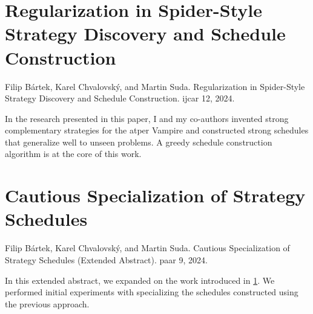 \section{Regularization in Spider-Style Strategy Discovery and Schedule Construction}
\label{sec:results:regularization}

Filip Bártek, Karel Chvalovský, and Martin Suda.
Regularization in Spider-Style Strategy Discovery and Schedule Construction.
\Acrlong{ijcar} 12, 2024.
\cite{DBLP:conf/ijcar/BartekCS24}

In the research presented in this paper,
I and my co-authors invented strong complementary strategies for the \gls{atper} Vampire and constructed strong schedules that generalize well to unseen problems.
A greedy schedule construction algorithm is at the core of this work.


\section{Cautious Specialization of Strategy Schedules}
\label{sec:results:cautious}

Filip Bártek, Karel Chvalovský, and Martin Suda.
Cautious Specialization of Strategy Schedules (Extended Abstract).
\Acrlong{paar} 9, 2024.
\cite{DBLP:conf/paar/BartekC024}

In this extended abstract, we expanded on the work introduced in \cref{sec:results:regularization}.
We performed initial experiments with specializing the schedules constructed using the previous approach.


